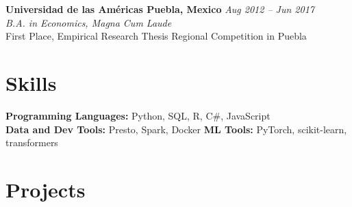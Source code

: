 \documentclass[10pt,letterpaper]{article}
\begin{document}
\vspace{4pt}
\textbf{Universidad de las Am\'ericas Puebla, Mexico} \hfill {\itshape Aug 2012 -- Jun 2017}\\
{\itshape B.A. in Economics, Magna Cum Laude}\\
First Place, Empirical Research Thesis Regional Competition in Puebla

\section{Skills}
\small
\textbf{Programming Languages:} Python, SQL, R, C\#, JavaScript\\[1pt]
\textbf{Data and Dev Tools:} Presto, Spark, Docker \quad\textbf{ML Tools:} PyTorch, scikit-learn, transformers

\newpage
\normalsize
\section{Projects}

\newcommand{\plink}[2]{\href{#1}{\textcolor{linkblue}{\underline{#2}}}}
\end{document}
